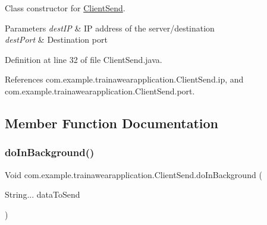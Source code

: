 Class constructor for \mbox{\hyperlink{classcom_1_1example_1_1trainawearapplication_1_1_client_send}{Client\+Send}}. 


\begin{DoxyParams}{Parameters}
{\em dest\+IP} & IP address of the server/destination \\
\hline
{\em dest\+Port} & Destination port \\
\hline
\end{DoxyParams}


Definition at line 32 of file Client\+Send.\+java.


\begin{DoxyCode}{0}

\end{DoxyCode}


References com.\+example.\+trainawearapplication.\+Client\+Send.\+ip, and com.\+example.\+trainawearapplication.\+Client\+Send.\+port.



\subsection{Member Function Documentation}
\mbox{\label{classcom_1_1example_1_1trainawearapplication_1_1_client_send_ad8e0bcd2078b23e83c1060065834ae7d}} 
\subsubsection{\texorpdfstring{doInBackground()}{doInBackground()}}
{\footnotesize\ttfamily Void com.\+example.\+trainawearapplication.\+Client\+Send.\+do\+In\+Background (\begin{DoxyParamCaption}\item[{String...}]{data\+To\+Send }\end{DoxyParamCaption})}



